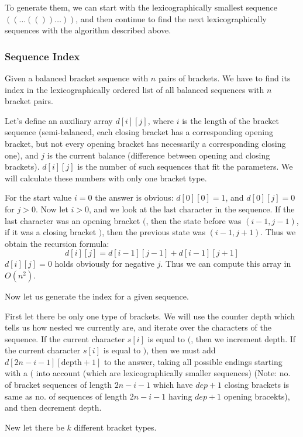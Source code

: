 \documentclass[8pt, a4paper, oneside, twocolumn]{extarticle}
\begin{document}
To generate them, we can start with the lexicographically smallest sequence $((\dots(())\dots))$, and then continue to find the next lexicographically sequences with the algorithm described above. 
\subsubsection{Sequence Index}
Given a balanced bracket sequence with $n$ pairs of brackets. We have to find its index in the lexicographically ordered list of all balanced sequences with $n$ bracket pairs.

Let's define an auxiliary array $d[i][j]$, where $i$ is the length of the bracket sequence (semi-balanced, each closing bracket has a corresponding opening bracket, but not every opening bracket has necessarily a corresponding closing one), and $j$ is the current balance (difference between opening and closing brackets). $d[i][j]$ is the number of such sequences that fit the parameters. We will calculate these numbers with only one bracket type.

For the start value $i = 0$ the answer is obvious: $d[0][0] = 1$, and $d[0][j] = 0$ for $j > 0$. Now let $i > 0$, and we look at the last character in the sequence. If the last character was an opening bracket $($, then the state before was $(i-1, j-1)$, if it was a closing bracket $)$, then the previous state was $(i-1, j+1)$. Thus we obtain the recursion formula: $$d[i][j] = d[i-1][j-1] + d[i-1][j+1]$$ $d[i][j] = 0$ holds obviously for negative $j$. Thus we can compute this array in $O(n^2)$.

Now let us generate the index for a given sequence.

First let there be only one type of brackets. We will use the counter $\text{depth}$ which tells us how nested we currently are, and iterate over the characters of the sequence. If the current character $s[i]$ is equal to $($, then we increment $\text{depth}$. If the current character $s[i]$ is equal to $)$, then we must add $d[2n-i-1][\text{depth}+1]$ to the answer, taking all possible endings starting with a $($ into account (which are lexicographically smaller sequences) (Note: no. of bracket sequences of length $2n - i - 1$ which have $dep + 1$ closing brackets is same as no. of sequences of length $2n - i - 1$ having $dep + 1$ opening bracekts), and then decrement $\text{depth}$.

New let there be $k$ different bracket types.
\end{document}

